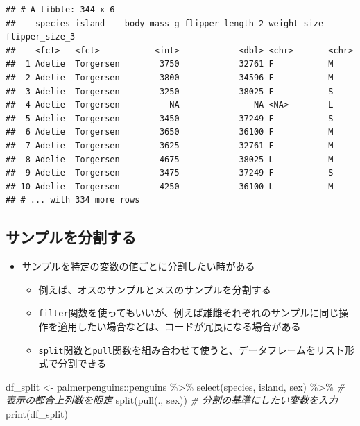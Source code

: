 \documentclass[
]{ltjsarticle}
\newenvironment{Shaded}{\begin{snugshade}}{\end{snugshade}}
\newcommand{\CommentTok}[1]{\textcolor[rgb]{0.56,0.35,0.01}{\textit{#1}}}
\newcommand{\FunctionTok}[1]{\textcolor[rgb]{0.00,0.00,0.00}{#1}}
\newcommand{\NormalTok}[1]{#1}
\newcommand{\OtherTok}[1]{\textcolor[rgb]{0.56,0.35,0.01}{#1}}
\newcommand{\SpecialCharTok}[1]{\textcolor[rgb]{0.00,0.00,0.00}{#1}}
\providecommand{\tightlist}{%
  \setlength{\itemsep}{0pt}\setlength{\parskip}{0pt}}
\begin{document}
\begin{verbatim}
## # A tibble: 344 x 6
##    species island    body_mass_g flipper_length_2 weight_size flipper_size_3
##    <fct>   <fct>           <int>            <dbl> <chr>       <chr>         
##  1 Adelie  Torgersen        3750            32761 F           M             
##  2 Adelie  Torgersen        3800            34596 F           M             
##  3 Adelie  Torgersen        3250            38025 F           S             
##  4 Adelie  Torgersen          NA               NA <NA>        L             
##  5 Adelie  Torgersen        3450            37249 F           S             
##  6 Adelie  Torgersen        3650            36100 F           M             
##  7 Adelie  Torgersen        3625            32761 F           M             
##  8 Adelie  Torgersen        4675            38025 L           M             
##  9 Adelie  Torgersen        3475            37249 F           S             
## 10 Adelie  Torgersen        4250            36100 L           M             
## # ... with 334 more rows
\end{verbatim}

\hypertarget{ux30b5ux30f3ux30d7ux30ebux3092ux5206ux5272ux3059ux308b}{%
\subsection{サンプルを分割する}\label{ux30b5ux30f3ux30d7ux30ebux3092ux5206ux5272ux3059ux308b}}

\begin{itemize}
\tightlist
\item
  サンプルを特定の変数の値ごとに分割したい時がある

  \begin{itemize}
  \tightlist
  \item
    例えば、オスのサンプルとメスのサンプルを分割する
  \item
    \texttt{filter}関数を使ってもいいが、例えば雄雌それぞれのサンプルに同じ操作を適用したい場合などは、コードが冗長になる場合がある
  \item
    \texttt{split}関数と\texttt{pull}関数を組み合わせて使うと、データフレームをリスト形式で分割できる
  \end{itemize}
\end{itemize}

\begin{Shaded}
\begin{Highlighting}[]
\NormalTok{df\_split }\OtherTok{\textless{}{-}}\NormalTok{ palmerpenguins}\SpecialCharTok{::}\NormalTok{penguins }\SpecialCharTok{\%\textgreater{}\%}
  \FunctionTok{select}\NormalTok{(species, island, sex) }\SpecialCharTok{\%\textgreater{}\%} \CommentTok{\# 表示の都合上列数を限定}
  \FunctionTok{split}\NormalTok{(}\FunctionTok{pull}\NormalTok{(., sex)) }\CommentTok{\# 分割の基準にしたい変数を入力}
\FunctionTok{print}\NormalTok{(df\_split)}
\end{Highlighting}
\end{Shaded}
\end{document}
